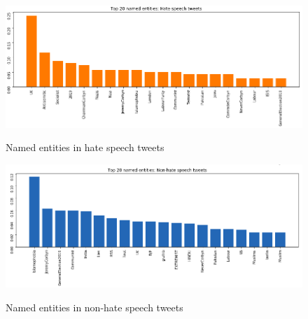 \documentclass[conference]{IEEEtran}
\begin{document}
\begin{figure}[!t] 
  \centering 
  \includegraphics[width=5.0in]{entities_hate} \label{fig:entities_hate} \hfil 
  \caption{Named entities in hate speech tweets}     
\end{figure} 


\begin{figure}[!t] 
  \centering 
  \includegraphics[width=5.0in]{entities_no_hate} \label{fig:entities_non_hate} \hfil 
  \caption{Named entities in non-hate speech tweets}     
\end{figure} 
\end{document}
